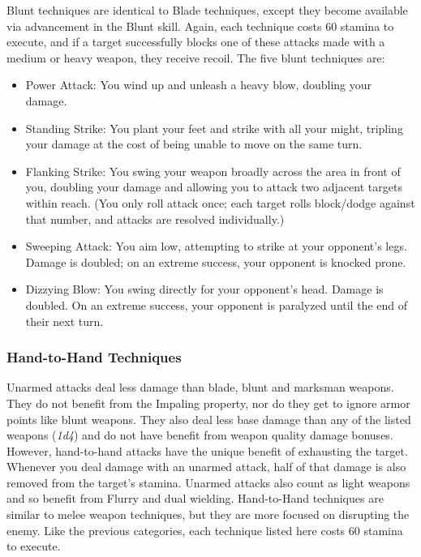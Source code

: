 Blunt techniques are identical to Blade techniques, except they become available via advancement in the Blunt skill. Again, each technique costs 60 stamina to execute, and if a target successfully blocks one of these attacks made with a medium or heavy weapon, they receive recoil. The five blunt techniques are:

\begin{itemize}
	\item Power Attack: You wind up and unleash a heavy blow, doubling your damage.
	\item Standing Strike: You plant your feet and strike with all your might, tripling your damage at the cost of being unable to move on the same turn.
	\item Flanking Strike: You swing your weapon broadly across the area in front of you, doubling your damage and allowing you to attack two adjacent targets within reach. (You only roll attack once; each target rolls block/dodge against that number, and attacks are resolved individually.)
	\item Sweeping Attack: You aim low, attempting to strike at your opponent's legs. Damage is doubled; on an extreme success, your opponent is knocked prone.
	\item Dizzying Blow: You swing directly for your opponent's head. Damage is doubled. On an extreme success, your opponent is paralyzed until the end of their next turn.
\end{itemize}

\subsubsection{Hand-to-Hand Techniques}

Unarmed attacks deal less damage than blade, blunt and marksman weapons. They do not benefit from the Impaling property, nor do they get to ignore armor points like blunt weapons. They also deal less base damage than any of the listed weapons (\textit{1d4}) and do not have benefit from weapon quality damage bonuses. However, hand-to-hand attacks have the unique benefit of exhausting the target. Whenever you deal damage with an unarmed attack, half of that damage is also removed from the target's stamina. Unarmed attacks also count as light weapons and so benefit from Flurry and dual wielding. Hand-to-Hand techniques are similar to melee weapon techniques, but they are more focused on disrupting the enemy. Like the previous categories, each technique listed here costs 60 stamina to execute.

